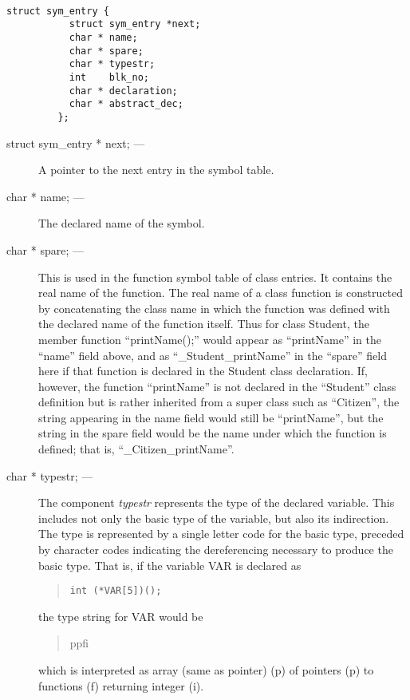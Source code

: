 \begin{verbatim}

struct sym_entry {
		   struct sym_entry *next;
		   char * name;
		   char * spare;
		   char * typestr;
		   int 	  blk_no;
		   char * declaration;
		   char * abstract_dec;
		 };

\end{verbatim}
\vspace{3ex}
\begin{description}
\item[struct sym\_entry * next; ---]
A pointer to the next entry in the symbol table.
\item[char * name; ---]
The declared name of the symbol.
\item[char * spare; ---]
This is used in the function symbol table of class entries.  It contains the
real name of the function.  The real name of a class function is constructed
by concatenating the class name in which the function was defined with the
declared name of the function itself.  Thus for class Student, the member
function ``printName();'' would appear as ``printName'' in the ``name'' field
above, and as ``\_Student\_printName'' in the ``spare'' field here if that
function is declared in the Student class declaration.  If, however, the
function ``printName'' is not declared in the ``Student'' class definition but
is rather inherited from a super class such as ``Citizen'', the string
appearing in the name field would still be ``printName'', but the string in
the spare field would be the name under which the function is defined;
that is, ``\_Citizen\_printName''.
\item[char * typestr; ---]
The component {\em typestr} represents the type of the declared variable.  This
includes not only the basic type of the variable, but also its indirection.
The type is represented by a single letter code for the basic type,
preceded by character codes indicating the dereferencing necessary to
produce the basic type.  That is, if the variable VAR is declared as
\begin{quote} \tt int (*VAR[5])(); \end{quote}
the type string for VAR would be
\begin{quote} ppfi \end{quote}
which is interpreted as array (same as pointer) (p) of pointers (p)
to functions (f) returning integer (i).


\end{description}
